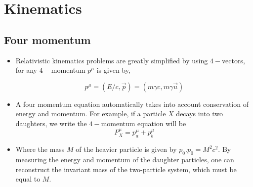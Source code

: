 
\section{Kinematics}
\subsection{Four momentum}
\noindent
\begin{itemize}
    \item 
Relativistic kinematics problems are greatly simplified by using $4-$vectors,
for any $4-$momentum $p^{\mu}$ is given by,

\begin{equation}
    p^{\mu} = (E/c, \Vec{p})= (m\gamma c, m \gamma \Vec{u})
\end{equation}
\item
A four momentum equation automatically takes into account conservation of energy and momentum. For example, if a particle $X$ decays into two daughters,
we write the $4-$momentum equation will be
\begin{equation}
  P_{X}^\mu = p_{a}^\mu + p_{b}^\mu  
\end{equation}
\item Where the mass $M$ of the heavier particle is given by $p_{0}.p_{0}=M^2c^2$. By measuring the energy and momentum of the daughter particles, one can reconstruct the invariant mass of the two-particle system, which must be equal to $M$.
\end{itemize}
   

